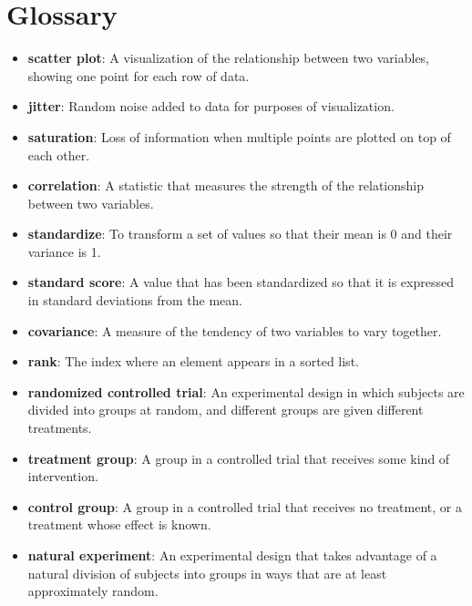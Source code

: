   \section*{Glossary} \begin{itemize}
	
	\item {\bf scatter plot}: A visualization of the relationship between
	two variables, showing one point for each row of data.
	
	\item {\bf jitter}: Random noise added to data for purposes of
	visualization.
	
	\item {\bf saturation}: Loss of information when multiple points are
	plotted on top of each other. 
	
	\item {\bf correlation}: A statistic that measures the strength of the
	relationship between two variables.
	
	\item {\bf standardize}: To transform a set of values so that their mean is 0 and
	their variance is 1.
	
	\item {\bf standard score}: A value that has been standardized so that it is
	expressed in standard deviations from the mean.
	
	\item {\bf covariance}: A measure of the tendency of two variables
	to vary together.
	
	\item {\bf rank}: The index where an element appears in a sorted list.
	
	\item {\bf randomized controlled trial}: An experimental design in which subjects
	are divided into groups at random, and different groups are given different
	treatments.
	
	\item {\bf treatment group}: A group in a controlled trial that receives
	some kind of intervention.
	
	\item {\bf control group}: A group in a controlled trial that receives no
	treatment, or a treatment whose effect is known.
	
	\item {\bf natural experiment}: An experimental design that takes advantage of
	a natural division of subjects into groups in ways that are at least
	approximately random.
	
\end{itemize}

